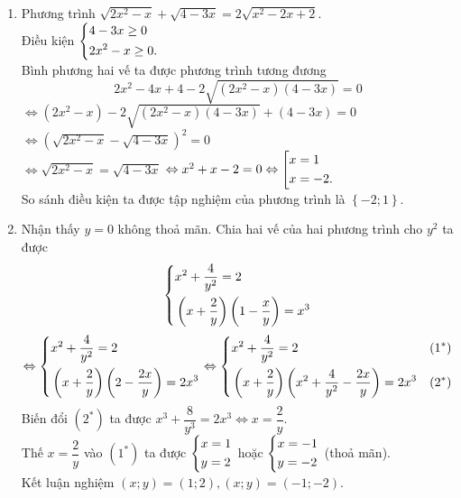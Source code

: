 \loigiai
{
\begin{enumerate}[1)]
\item Phương trình $\sqrt{2x^2 - x} + \sqrt{4 - 3x}=2\sqrt{x^2 - 2x + 2}.$\\
Điều kiện $\left\{\begin{aligned}& 4 - 3x\ge 0 \\   & 2x^2 - x\ge 0.\end{aligned}\right.$\\
Bình phương hai vế ta được phương trình tương đương 
 $$2x^2 - 4x + 4 - 2\sqrt{(2x^2 - x)(4 - 3x)}=0$$
 $\Leftrightarrow (2x^2 - x) - 2\sqrt{(2x^2 - x)(4 - 3x)} + (4 - 3x)=0$
 $\Leftrightarrow {\left(\sqrt{2x^2 - x} - \sqrt{4 - 3x}\right)}^2=0$\\
$\Leftrightarrow \sqrt{2x^2 - x}=\sqrt{4 - 3x}$ $\Leftrightarrow x^2 + x - 2=0\Leftrightarrow \left[\begin{aligned}& x=1 \\ 
 & x= - 2.\end{aligned}\right.$\\
So sánh điều kiện ta được tập nghiệm của phương trình là $\left\{- 2; 1\right\}$. 
\item  Nhận thấy $y=0$ không thoả mãn. Chia hai vế của hai phương trình cho $y^2$ ta được
 $$\left\{\begin{aligned}& x^2 + \dfrac{4}{y^2}=2 \\   & \left(x + \dfrac{2}{y}\right)\left(1 - \dfrac{x}{y}\right)=x^3\end{aligned}\right. $$
$$ \Leftrightarrow  \left\{\begin{aligned}& x^2 + \dfrac{4}{y^2}=2 \\   & \left(x + \dfrac{2}{y}\right)\left(2 - \dfrac{2x}{y}\right)=2x^3 \end{aligned}\right. \Leftrightarrow \left\{\begin{aligned}& x^2 + \dfrac{4}{y^2}=2 & (1^*) \\   & \left(x + \dfrac{2}{y}\right)\left(x^2 + \dfrac{4}{y^2} - \dfrac{2x}{y}\right)=2x^3 & (2^*)\end{aligned}\right.$$
Biến đổi $(2^*)$ ta được $x^3 + \dfrac{8}{y^3}=2x^3\Leftrightarrow x=\dfrac{2}{y}$.\\
Thế $x=\dfrac{2}{y}$ vào $(1^*)$ ta được $\left\{\begin{aligned}& x=1 \\   & y=2 \end{aligned}\right.$ hoặc $\left\{\begin{aligned}& x= - 1 \\   & y= - 2\end{aligned}\right.$ (thoả mãn).\\
Kết luận nghiệm $(x; y)=\left(1; 2\right), (x; y)=\left(- 1; - 2\right)$. 

\end{enumerate}
}

